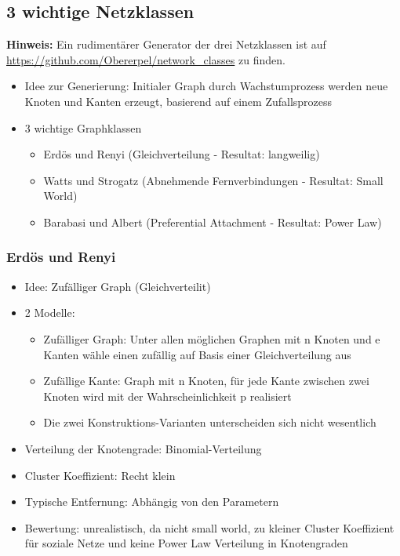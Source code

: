 \documentclass{article} %
\begin{document}
	\subsection{3 wichtige Netzklassen}
	\textbf{Hinweis:} Ein rudimentärer Generator der drei Netzklassen ist auf \url{https://github.com/Obererpel/network_classes} zu finden. 
	\begin{itemize}
		\item Idee zur Generierung: Initialer Graph durch Wachstumprozess werden neue Knoten und Kanten erzeugt, basierend auf einem Zufallsprozess
		\item 3 wichtige Graphklassen
		\begin{itemize}
			\item Erdös und Renyi (Gleichverteilung - Resultat: \glqq langweilig\grqq)
			\item Watts und Strogatz (Abnehmende Fernverbindungen - Resultat: Small World)
			\item Barabasi und Albert (Preferential Attachment - Resultat: Power Law)
		\end{itemize}
	\end{itemize}
	\subsubsection{Erdös und Renyi}
	\begin{itemize}
		\item Idee: Zufälliger Graph (Gleichverteilit)
		\item 2 Modelle:
		\begin{itemize}
			\item Zufälliger Graph: Unter allen möglichen Graphen mit n Knoten und e Kanten wähle einen zufällig auf Basis einer Gleichverteilung aus
			\item Zufällige Kante: Graph mit n Knoten, für jede Kante zwischen zwei Knoten wird mit der Wahrscheinlichkeit p realisiert
			\item Die zwei Konstruktions-Varianten unterscheiden sich \glqq nicht wesentlich\grqq
		\end{itemize}
		\item Verteilung der Knotengrade: Binomial-Verteilung
		\item Cluster Koeffizient: Recht klein
		\item Typische Entfernung: Abhängig von den Parametern
		\item Bewertung: unrealistisch, da nicht small world, zu kleiner Cluster Koeffizient für soziale Netze und keine Power Law Verteilung in Knotengraden
	\end{itemize}
	
\end{document}
